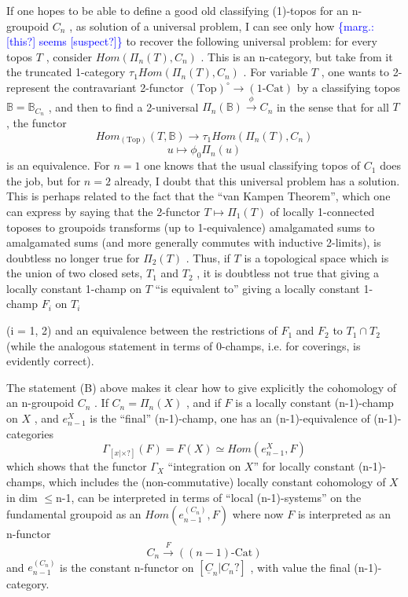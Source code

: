 \documentclass[11pt]{article}
\newcommand{\scanpage}[1]{\par\bigskip\noindent{\small\sffamily[scan #1]}\par}
\newcommand{\mspage}[1]{{\small\sffamily[p.\,#1]}}
\newcommand{\margin}[1]{\textcolor{blue}{\{\textsf{marg.:} #1\}}}
\newcommand{\unsure}[1]{[#1?]}
\begin{document}
If one hopes to be able to define a good old classifying (1)-topos for
an n-groupoid $C_n$ , as solution of a universal problem, I can see only how
\margin{\unsure{this} seems \unsure{suspect}} to recover the following universal problem: for every topos $T$ , consider
$\mathit{Hom}(\Pi_n(T), C_n)$ . This is an n-category, but take from it the truncated
1-category $\tau_1 \mathit{Hom}(\Pi_n(T), C_n)$ . For variable $T$ , one wants to 2-represent
the contravariant 2-functor $(\mathrm{Top})^{\circ} \rightarrow (1\text{-}\mathrm{Cat})$ by a classifying topos
$\mathbb{B} = \mathbb{B}_{C_n}$ , and then to find a 2-universal $\Pi_n(\mathbb{B}) \xrightarrow{\ \phi\ } C_n$ in the sense that
for all $T$ , the functor
\[ \mathit{Hom}_{(\mathrm{Top})}(T, \mathbb{B}) \longrightarrow \tau_1 \mathit{Hom}(\Pi_n(T), C_n) \]
\[ u \longmapsto \phi_0 \Pi_n(u) \]
is an equivalence. For $n = 1$ one knows that the usual classifying topos
of $C_1$ does the job, but for $n = 2$ already, I doubt that this universal
problem has a solution. This is perhaps related to the fact that the
``van Kampen Theorem'', which one can express by saying that the 2-functor
$T \longmapsto \Pi_1(T)$ of locally 1-connected toposes to groupoids transforms (up to
1-equivalence) amalgamated sums to amalgamated sums (and more generally commutes
with inductive 2-limits), is doubtless no longer true for $\Pi_2(T)$ . Thus,
if $T$ is a topological space which is the union of two closed sets, $T_1$ and
$T_2$ , it is doubtless not true that giving a locally constant 1-champ
on $T$ ``is equivalent to'' giving a locally constant 1-champ $F_i$ on $T_i$

\mspage{124}

\clearpage
\scanpage{134-2/124}
\mspage{- 3 -}

(i = 1, 2) and an equivalence between the restrictions of $F_1$ and $F_2$
to $T_1 \cap T_2$ (while the analogous statement in terms of 0-champs, i.e. for
coverings, is evidently correct).

The statement (B) above makes it clear how to give explicitly the
cohomology of an n-groupoid $C_n$ . If $C_n = \Pi_n(X)$ , and if $F$ is a locally
constant (n-1)-champ on $X$ , and $e^{X}_{n-1}$ is the ``final'' (n-1)-champ, one has
an (n-1)-equivalence of (n-1)-categories
\[ \Gamma_{\unsure{x|\times}}(F) = F(X) \simeq \mathit{Hom}(e^{X}_{n-1}, F) \]
which shows that the functor $\Gamma_X$ ``integration on $X$'' for locally constant
(n-1)-champs, which includes the (non-commutative) locally constant cohomology
of $X$ in dim $\leq$n-1, can be interpreted in terms of ``local (n-1)-systems''
on the fundamental groupoid as an
$\mathit{Hom}(e^{(C_n)}_{n-1} , F)$ where now $F$ is interpreted as an n-functor
\[ C_n \xrightarrow{\ F\ } ((n-1)\text{-Cat}) \]
and $e^{(C_n)}_{n-1}$ is the constant n-functor on $\unsure{\underline{C}_n|C_n}$ , with value the final (n-1)-
category.
\end{document}
